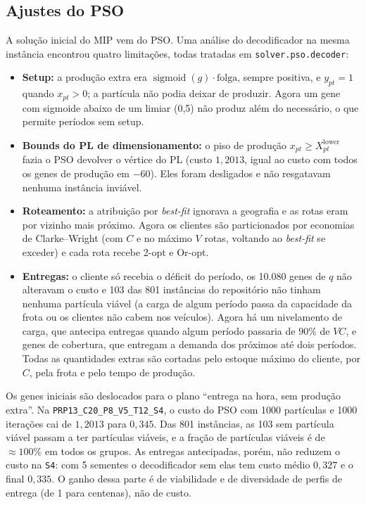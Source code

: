 \documentclass[11pt,a4paper]{article}
\begin{document}
\subsection{Ajustes do PSO}
\label{sec:pso-adjustments}

A solução inicial do MIP vem do PSO. Uma análise do decodificador na mesma
instância encontrou quatro limitações, todas tratadas em
\texttt{solver.pso.decoder}:
\begin{itemize}[leftmargin=1.8em]
  \item \textbf{Setup:} a produção extra era $\operatorname{sigmoid}(g)\cdot
  \text{folga}$, sempre positiva, e $y_{pt}=1$ quando $x_{pt}>0$; a partícula
  não podia deixar de produzir. Agora um gene com sigmoide abaixo de um limiar
  (0,5) não produz além do necessário, o que permite períodos sem setup.
  \item \textbf{Bounds do PL de dimensionamento:} o piso de produção
  $x_{pt}\ge X^{\mathrm{lower}}_{pt}$ fazia o PSO devolver o vértice do PL
  (custo $1{,}2013$, igual ao custo com todos os genes de produção em $-60$).
  Eles foram desligados e não resgatavam nenhuma instância inviável.
  \item \textbf{Roteamento:} a atribuição por \emph{best-fit} ignorava a
  geografia e as rotas eram por vizinho mais próximo. Agora os clientes são
  particionados por economias de Clarke--Wright (com $C$ e no máximo $V$ rotas,
  voltando ao \emph{best-fit} se exceder) e cada rota recebe 2-opt e Or-opt.
  \item \textbf{Entregas:} o cliente só recebia o déficit do período, os
  10.080 genes de $q$ não alteravam o custo e 103 das 801 instâncias do
  repositório não tinham nenhuma partícula viável (a carga de algum período
  passa da capacidade da frota ou os clientes não cabem nos veículos). Agora há
  um nivelamento de carga, que antecipa entregas quando algum período passaria
  de $90\%$ de $VC$, e genes de cobertura, que entregam a demanda dos próximos
  até dois períodos. Todas as quantidades extras são cortadas pelo estoque
  máximo do cliente, por $C$, pela frota e pelo tempo de produção.
\end{itemize}
Os genes iniciais são deslocados para o plano ``entrega na hora, sem produção
extra''. Na \texttt{PRP13\_C20\_P8\_V5\_T12\_S4}, o custo do PSO com 1000
partículas e 1000 iterações cai de $1{,}2013$ para $0{,}345$. Das 801
instâncias, as 103 sem partícula viável passam a ter partículas viáveis, e a
fração de partículas viáveis é de $\approx100\%$ em todos os grupos. As
entregas antecipadas, porém, não reduzem o custo na \texttt{S4}: com 5 sementes
o decodificador sem elas tem custo médio $0{,}327$ e o final $0{,}335$. O ganho
dessa parte é de viabilidade e de diversidade de perfis de entrega (de 1 para
centenas), não de custo.
\end{document}
